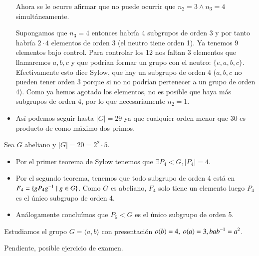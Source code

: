 \begin{ej}
\begin{itemize}
	Ahora se le ocurre afirmar que no puede ocurrir que $n_2 = 3 \land n_3 = 4$ simultáneamente.
	
	Supongamos que $n_3 = 4$ entonces habría 4 subgrupos de orden 3 y por tanto habría $2 \cdot 4$ elementos de orden 3 (el neutro tiene orden 1). Ya tenemos 9 elementos bajo control. Para controlar los 12 nos faltan 3 elementos que llamaremos $a,b,c$ y que podrían formar un grupo con el neutro: $\{e, a, b, c\}$. Efectivamente esto dice Sylow, que hay un subgrupo de orden 4 ($a,b,c$ no pueden tener orden 3 porque si no no podrían pertenecer a un grupo de orden 4). Como ya hemos agotado los elementos, no es posible que haya más subgrupos de orden 4, por lo que necesariamente $n_2 = 1$.
	\item Así podemos seguir hasta $|G| = 29$ ya que cualquier orden menor que 30 es producto de como máximo dos primos.
	\end{itemize}
\end{ej}

\begin{ej}
	Sea $G$ abeliano y $|G| = 20 = 2^2\cdot 5$.
	\begin{itemize}
		\item Por el primer teorema de Sylow tenemos que $\exists P_4 < G, |P_4| = 4$.
		\item Por el segundo teorema, tenemos que todo subgrupo de orden 4 está en $F_4 = \{gP_4g^{-1} \mid g \in G\}$. Como $G$ es abeliano, $F_4$ solo tiene un elemento luego $P_4$ es el único subgrupo de orden 4.
		\item Análogamente concluímos que $P_5 < G$ es el único subgrupo de orden 5.
	\end{itemize}
\end{ej}

\begin{ej}
	Estudiamos el grupo $G = \langle a, b \rangle$ con presentación $o(b) = 4,\ o(a) = 3, bab^{-1} = a^2$.
	
	Pendiente, posible ejercicio de examen.
\end{ej}



